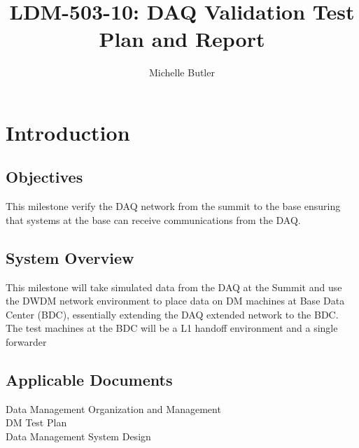 \documentclass[DM,lsstdraft,STR,toc]{lsstdoc}
\begin{document}
\def\milestoneName{LDM-503-10 DAQ Validation}
\def\milestoneId{LVV-P54}
\def\product{Data Management}


\title{LDM-503-10: DAQ Validation Test Plan and Report}
\setDocRef{\lsstDocType-\lsstDocNum}
\date{\vcsdate}
\author{ Michelle Butler }






\maketitle

\section{Introduction}
\label{sect:intro}


\subsection{Objectives}
\label{sect:objectives}

 This milestone verify the DAQ network from the summit to the base
ensuring that systems at the base can receive communications from the
DAQ.~~



\subsection{System Overview}
\label{sect:systemoverview}

 This milestone will take simulated data from the DAQ at the Summit and
use the DWDM network environment to place data on DM machines at Base
Data Center (BDC), essentially extending the DAQ extended network to the
BDC. The test machines at the BDC will be a L1 handoff environment and a
single forwarder\\[2\baselineskip]

\subsection{Applicable Documents}\label{applicable-documents}

 Data Management Organization and Management\\
 DM Test Plan\\
 Data Management System Design
\end{document}
